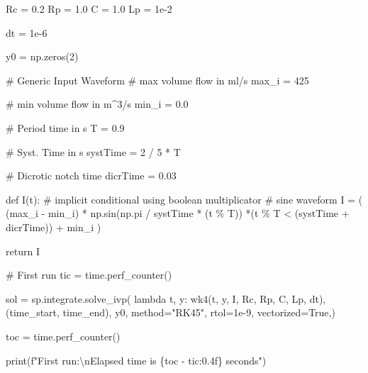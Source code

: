\documentclass[
  a4paper,
  DIV=11,
  numbers=noendperiod,
  oneside]{scrreprt}
\newenvironment{Shaded}{\begin{snugshade}}{\end{snugshade}}
\newcommand{\BuiltInTok}[1]{\textcolor[rgb]{0.00,0.23,0.31}{#1}}
\newcommand{\CharTok}[1]{\textcolor[rgb]{0.13,0.47,0.30}{#1}}
\newcommand{\CommentTok}[1]{\textcolor[rgb]{0.37,0.37,0.37}{#1}}
\newcommand{\ControlFlowTok}[1]{\textcolor[rgb]{0.00,0.23,0.31}{#1}}
\newcommand{\DecValTok}[1]{\textcolor[rgb]{0.68,0.00,0.00}{#1}}
\newcommand{\FloatTok}[1]{\textcolor[rgb]{0.68,0.00,0.00}{#1}}
\newcommand{\KeywordTok}[1]{\textcolor[rgb]{0.00,0.23,0.31}{#1}}
\newcommand{\NormalTok}[1]{\textcolor[rgb]{0.00,0.23,0.31}{#1}}
\newcommand{\OperatorTok}[1]{\textcolor[rgb]{0.37,0.37,0.37}{#1}}
\newcommand{\SpecialCharTok}[1]{\textcolor[rgb]{0.37,0.37,0.37}{#1}}
\newcommand{\SpecialStringTok}[1]{\textcolor[rgb]{0.13,0.47,0.30}{#1}}
\newcommand{\StringTok}[1]{\textcolor[rgb]{0.13,0.47,0.30}{#1}}
\newcommand{\VariableTok}[1]{\textcolor[rgb]{0.07,0.07,0.07}{#1}}
\begin{document}
\begin{Shaded}
\begin{Highlighting}[]
\NormalTok{Rc }\OperatorTok{=} \FloatTok{0.2}
\NormalTok{Rp }\OperatorTok{=} \FloatTok{1.0}
\NormalTok{C }\OperatorTok{=} \FloatTok{1.0}
\NormalTok{Lp }\OperatorTok{=} \FloatTok{1e{-}2}

\NormalTok{dt }\OperatorTok{=} \FloatTok{1e{-}6}

\NormalTok{y0 }\OperatorTok{=}\NormalTok{ np.zeros(}\DecValTok{2}\NormalTok{)}

\CommentTok{\# Generic Input Waveform}
\CommentTok{\# max volume flow in ml/s}
\NormalTok{max\_i }\OperatorTok{=} \DecValTok{425}

\CommentTok{\# min volume flow in m\^{}3/s}
\NormalTok{min\_i }\OperatorTok{=} \FloatTok{0.0}

\CommentTok{\# Period time in s}
\NormalTok{T }\OperatorTok{=} \FloatTok{0.9}

\CommentTok{\# Syst. Time in s}
\NormalTok{systTime }\OperatorTok{=} \DecValTok{2} \OperatorTok{/} \DecValTok{5} \OperatorTok{*}\NormalTok{ T}

\CommentTok{\# Dicrotic notch time}
\NormalTok{dicrTime }\OperatorTok{=} \FloatTok{0.03}

\KeywordTok{def}\NormalTok{ I(t):}
    \CommentTok{\# implicit conditional using boolean multiplicator}
    \CommentTok{\# sine waveform}
\NormalTok{    I }\OperatorTok{=}\NormalTok{ (}
\NormalTok{        (max\_i }\OperatorTok{{-}}\NormalTok{ min\_i) }\OperatorTok{*}\NormalTok{ np.sin(np.pi }\OperatorTok{/}\NormalTok{ systTime }\OperatorTok{*}\NormalTok{ (t }\OperatorTok{\%}\NormalTok{ T))}
        \OperatorTok{*}\NormalTok{(t }\OperatorTok{\%}\NormalTok{ T }\OperatorTok{\textless{}}\NormalTok{ (systTime }\OperatorTok{+}\NormalTok{ dicrTime)) }\OperatorTok{+}\NormalTok{ min\_i}
\NormalTok{    )}

    \ControlFlowTok{return}\NormalTok{ I}

\CommentTok{\# First run}
\NormalTok{tic }\OperatorTok{=}\NormalTok{ time.perf\_counter()}

\NormalTok{sol }\OperatorTok{=}\NormalTok{ sp.integrate.solve\_ivp(}
    \KeywordTok{lambda}\NormalTok{ t, y: wk4(t, y, I, Rc, Rp, C, Lp, dt),}
\NormalTok{    (time\_start, time\_end),}
\NormalTok{    y0,}
\NormalTok{    method}\OperatorTok{=}\StringTok{"RK45"}\NormalTok{,}
\NormalTok{    rtol}\OperatorTok{=}\FloatTok{1e{-}9}\NormalTok{,}
\NormalTok{    vectorized}\OperatorTok{=}\VariableTok{True}\NormalTok{,)}

\NormalTok{toc }\OperatorTok{=}\NormalTok{ time.perf\_counter()}

\BuiltInTok{print}\NormalTok{(}\SpecialStringTok{f"First run:}\CharTok{\textbackslash{}n}\SpecialStringTok{Elapsed time is }\SpecialCharTok{\{}\NormalTok{toc }\OperatorTok{{-}}\NormalTok{ tic}\SpecialCharTok{:0.4f\}}\SpecialStringTok{ seconds"}\NormalTok{)}


\end{Highlighting}
\end{Shaded}
\end{document}
